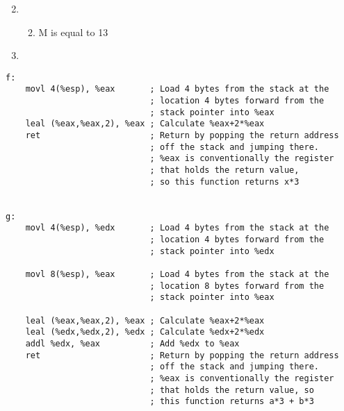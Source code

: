 \documentclass[12pt]{article}
\begin{document}
\begin{enumerate}
	\setcounter{enumi}{1}
	\item
	\begin{enumerate}
		\setcounter{enumii}{1}
		\item M is equal to 13
	\end{enumerate}
\end{enumerate}

\newpage

\begin{enumerate}
	\setcounter{enumi}{2}
	\item
\end{enumerate}
\begin{verbatim}
f:    
	movl 4(%esp), %eax       ; Load 4 bytes from the stack at the 
                             ; location 4 bytes forward from the 
                             ; stack pointer into %eax
	leal (%eax,%eax,2), %eax ; Calculate %eax+2*%eax
	ret                      ; Return by popping the return address 
                             ; off the stack and jumping there.  
                             ; %eax is conventionally the register 
                             ; that holds the return value, 
                             ; so this function returns x*3


g:
	movl 4(%esp), %edx       ; Load 4 bytes from the stack at the 
                             ; location 4 bytes forward from the 
                             ; stack pointer into %edx

	movl 8(%esp), %eax       ; Load 4 bytes from the stack at the 
                             ; location 8 bytes forward from the 
                             ; stack pointer into %eax

	leal (%eax,%eax,2), %eax ; Calculate %eax+2*%eax
	leal (%edx,%edx,2), %edx ; Calculate %edx+2*%edx
	addl %edx, %eax          ; Add %edx to %eax
	ret                      ; Return by popping the return address 
                             ; off the stack and jumping there.  
                             ; %eax is conventionally the register 
                             ; that holds the return value, so 
                             ; this function returns a*3 + b*3
\end{verbatim}
\end{document}
